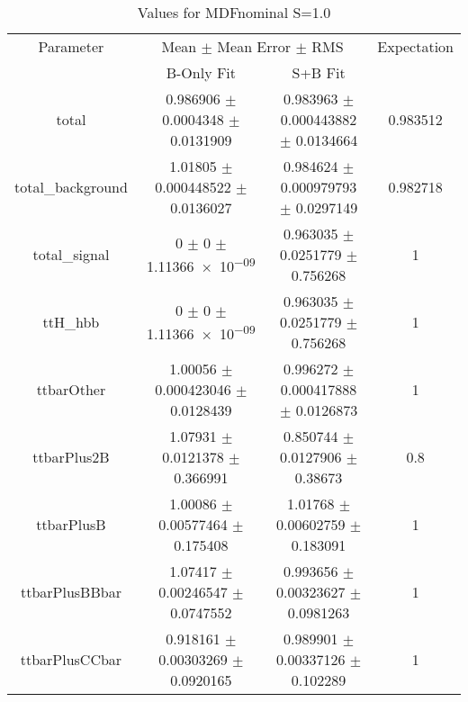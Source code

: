 \begin{table}
\centering
\caption{Values for MDFnominal S=1.0}
\begin{tabular}{cccc}
\toprule
Parameter & \multicolumn{2}{c}{Mean $\pm$ Mean Error $\pm$ RMS} & Expectation\\
 & B-Only Fit & S+B Fit & \\
\midrule
total & \num{0.986906} $\pm$ \num{0.0004348} $\pm$ \num{0.0131909} & \num{0.983963} $\pm$ \num{0.000443882} $\pm$ \num{0.0134664} & \num{0.983512}\\
total\_background & \num{1.01805} $\pm$ \num{0.000448522} $\pm$ \num{0.0136027} & \num{0.984624} $\pm$ \num{0.000979793} $\pm$ \num{0.0297149} & \num{0.982718}\\
total\_signal & \num{0} $\pm$ \num{0} $\pm$ \num{1.11366e-09} & \num{0.963035} $\pm$ \num{0.0251779} $\pm$ \num{0.756268} & \num{1}\\
ttH\_hbb & \num{0} $\pm$ \num{0} $\pm$ \num{1.11366e-09} & \num{0.963035} $\pm$ \num{0.0251779} $\pm$ \num{0.756268} & \num{1}\\
ttbarOther & \num{1.00056} $\pm$ \num{0.000423046} $\pm$ \num{0.0128439} & \num{0.996272} $\pm$ \num{0.000417888} $\pm$ \num{0.0126873} & \num{1}\\
ttbarPlus2B & \num{1.07931} $\pm$ \num{0.0121378} $\pm$ \num{0.366991} & \num{0.850744} $\pm$ \num{0.0127906} $\pm$ \num{0.38673} & \num{0.8}\\
ttbarPlusB & \num{1.00086} $\pm$ \num{0.00577464} $\pm$ \num{0.175408} & \num{1.01768} $\pm$ \num{0.00602759} $\pm$ \num{0.183091} & \num{1}\\
ttbarPlusBBbar & \num{1.07417} $\pm$ \num{0.00246547} $\pm$ \num{0.0747552} & \num{0.993656} $\pm$ \num{0.00323627} $\pm$ \num{0.0981263} & \num{1}\\
ttbarPlusCCbar & \num{0.918161} $\pm$ \num{0.00303269} $\pm$ \num{0.0920165} & \num{0.989901} $\pm$ \num{0.00337126} $\pm$ \num{0.102289} & \num{1}\\
\bottomrule
\end{tabular}
\end{table}